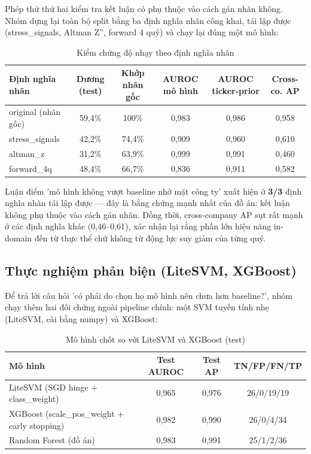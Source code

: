 \documentclass[13pt,a4paper]{extreport}
\begin{document}
Phép thử thứ hai kiểm tra kết luận có phụ thuộc vào cách gán nhãn không. Nhóm dựng lại toàn bộ split bằng ba định nghĩa nhãn công khai, tái lập được (stress\_signals, Altman Z'', forward 4 quý) và chạy lại đúng một mô hình:

\begin{table}[H]
\centering
\caption{Kiểm chứng độ nhạy theo định nghĩa nhãn}
\begin{center}
\footnotesize
\begin{tabular}{|l|c|c|c|c|c|}
\hline
\textbf{Định nghĩa nhãn} & \textbf{Dương (test)} & \textbf{Khớp nhãn gốc} & \textbf{AUROC mô hình} & \textbf{AUROC ticker-prior} & \textbf{Cross-co. AP} \\ \hline
original (nhãn gốc) & 59,4\% & 100\% & 0,983 & 0,986 & 0,958 \\ \hline
stress\_signals & 42,2\% & 74,4\% & 0,909 & 0,960 & 0,610 \\ \hline
altman\_z & 31,2\% & 63,9\% & 0,999 & 0,991 & 0,460 \\ \hline
forward\_4q & 48,4\% & 66,7\% & 0,836 & 0,911 & 0,582 \\ \hline
\end{tabular}
\end{center}
\end{table}

Luận điểm 'mô hình không vượt baseline nhớ mặt công ty' xuất hiện ở \textbf{3/3} định nghĩa nhãn tái lập được — đây là bằng chứng mạnh nhất của đồ án: kết luận không phụ thuộc vào cách gán nhãn. Đồng thời, cross-company AP sụt rất mạnh ở các định nghĩa khác (0,46–0,61), xác nhận lại rằng phần lớn hiệu năng in-domain đến từ thực thể chứ không từ động lực suy giảm của từng quý.

\subsection{Thực nghiệm phản biện (LiteSVM, XGBoost)}

Để trả lời câu hỏi 'có phải do chọn họ mô hình nên chưa hơn baseline?', nhóm chạy thêm hai đối chứng ngoài pipeline chính: một SVM tuyến tính nhẹ (LiteSVM, cài bằng numpy) và XGBoost:

\begin{table}[H]
\centering
\caption{Mô hình chốt so với LiteSVM và XGBoost (test)}
\begin{center}
\small
\begin{tabular}{|l|c|c|c|}
\hline
\textbf{Mô hình} & \textbf{Test AUROC} & \textbf{Test AP} & \textbf{TN/FP/FN/TP} \\ \hline
LiteSVM (SGD hinge + class\_weight) & 0,965 & 0,976 & 26/0/19/19 \\ \hline
XGBoost (scale\_pos\_weight + early stopping) & 0,982 & 0,990 & 26/0/4/34 \\ \hline
Random Forest (đồ án) & 0,983 & 0,991 & 25/1/2/36 \\ \hline
\end{tabular}
\end{center}
\end{table}
\end{document}
